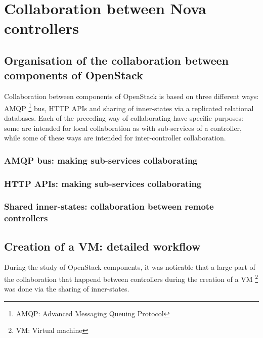\chapter{Collaboration between Nova controllers}
\label{sec:collaboration}



\section{Organisation of the collaboration between components of OpenStack}

Collaboration between components of OpenStack is based on three different ways:
AMQP \footnote{AMQP: Advanced Messaging Queuing Protocol} bus, HTTP APIs and
sharing of inner-states via a replicated relational databases. Each of the 
preceding way of collaborating have specific purposes: some are intended for 
local collaboration as with sub-services of a controller, while some of these
ways are intended for inter-controller collaboration.

\subsection{AMQP bus: making sub-services collaborating}

\subsection{HTTP APIs: making sub-services collaborating}

\subsection{Shared inner-states: collaboration between remote controllers}


\section{Creation of a VM: detailed workflow}

During the study of OpenStack components, it was noticable that a large part of
the collaboration that happend between controllers during the creation of a VM
\footnote{VM: Virtual machine} was done via the sharing of inner-states.

